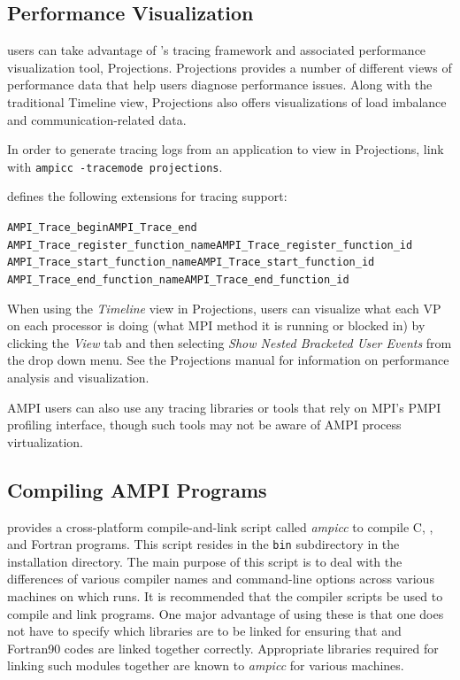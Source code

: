 \documentclass[10pt]{article}
\begin{document}
\subsection{Performance Visualization}
\ampi{} users can take advantage of \charmpp{}'s tracing framework and
associated performance visualization tool, Projections. Projections
provides a number of different views of performance data that help
users diagnose performance issues. Along with the traditional Timeline view,
Projections also offers visualizations of load imbalance and communication-related data.

In order to generate tracing logs from an application to view in Projections,
link with \texttt{ampicc -tracemode projections}.

\ampi{} defines the following extensions for tracing support:

\begin{alltt}
AMPI_Trace_begin                      AMPI_Trace_end
AMPI_Trace_register_function_name     AMPI_Trace_register_function_id
AMPI_Trace_start_function_name        AMPI_Trace_start_function_id
AMPI_Trace_end_function_name          AMPI_Trace_end_function_id
\end{alltt}

When using the \emph{Timeline} view in Projections, \ampi{} users can visualize
what each VP on each processor is doing (what MPI method it is running or blocked in)
by clicking the \emph{View} tab and then selecting \emph{Show Nested Bracketed User Events}
from the drop down menu.
See the Projections manual for information on performance analysis and visualization.

AMPI users can also use any tracing libraries or tools that rely on MPI's PMPI profiling interface,
though such tools may not be aware of AMPI process virtualization.

\subsection{Compiling AMPI Programs}

\ampi{} provides a cross-platform compile-and-link script called \emph{ampicc}
to compile C, \CC{}, and Fortran \ampi{} programs.  This script
resides in the \texttt{bin} subdirectory in the \charmpp{} installation
directory. The main purpose of this script is to deal with the differences of
various compiler names and command-line options across various machines on
which \ampi{} runs. It is recommended that the \ampi{} compiler
scripts be used to compile and link \ampi{} programs. One major advantage of
using these is that one does not have to specify which libraries are to be
linked for ensuring that \CC{} and Fortran90 codes are linked together
correctly. Appropriate libraries required for linking such modules together
are known to \emph{ampicc} for various machines.
\end{document}

